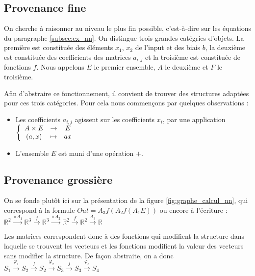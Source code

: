 \documentclass[11pt,a4paper]{article}
\newcommand{\R}{\ensuremath{\mathbb{R}}}
\begin{document}
	\subsection{Provenance fine}

	On cherche à raisonner au niveau le plus fin possible, c'est-à-dire sur les équations du paragraphe \ref{subsec:ex_nn}. On distingue trois grandes catégries d'objets. La première est constituée des éléments $x_1$, $x_2$ de l'input et des biais $b$, la deuxième est constituée des coefficients des matrices $a_{i,j}$ et la troisième est constituée de fonctions $f$. Nous appelons $E$ le premier ensemble, $A$ le deuxième et $F$ le troisième.
	
	Afin d'abstraire ce fonctionnement, il convient de trouver des structures adaptées pour ces trois catégories. Pour cela nous commençons par quelques observations :
	
	\begin{itemize}
	
		\item Les coefficients $a_{i,j}$ agissent sur les coefficients $x_{i}$, par une application 
		$\left\lbrace \begin{array}{c c c}
		 A \times E & \to & E \\
		 (a,x) & \mapsto & ax
\end{array}
\right.$
		
		\item L'ensemble $E$ est muni d'une opération $+$.
	
	\end{itemize}
	
	\subsection{Provenance grossière}
	
	On se fonde plutôt ici sur la présentation de la figure \ref{fig:graphe_calcul_nn}, qui correspond à la formule $Out=A_3f(A_2f(A_1 E))$ ou encore à l'écriture :
	$\R^2 \overset{\times A_1}{\longrightarrow} \R^3 \overset{f}{\longrightarrow} \R^3 \overset{\times A_2}{\longrightarrow} \R^2 \overset{f}{\longrightarrow} \R^2 \overset{A_3}{\longrightarrow} \R$
	
	Les matrices correspondent donc à des fonctions qui modifient la structure dans laquelle se trouvent les vecteurs et les fonctions modifient la valeur des vecteurs sans modifier la structure.
	De façon abstraite, on a donc $S_1 \overset{\varphi_1}{\longrightarrow} S_2 \overset{\overline{f}}{\longrightarrow} S_2 \overset{\varphi_2}{\longrightarrow} S_3 \overset{\overline{f}}{\longrightarrow} S_3 \overset{\varphi_3}{\longrightarrow} S_4$
	
\end{document}
